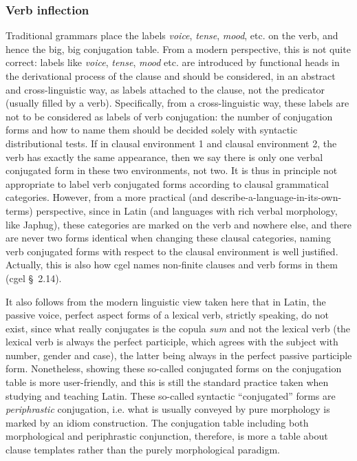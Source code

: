 \documentclass{article}
\newcommand*{\citesec}[1]{\S~{#1}}
\newcommand*{\term}[1]{\emph{#1}}
\newcommand*{\corpus}[1]{\emph{#1}}
\begin{document}
\subsubsection{Verb inflection}\label{sec:verb-inflection-abs}

Traditional grammars place the labels \term{voice}, \term{tense}, \term{mood}, etc. on the verb,
and hence the big, big conjugation table.
From a modern perspective, this is not quite correct:
labels like \term{voice}, \term{tense}, \term{mood} etc. are introduced by functional heads 
in the derivational process of the clause 
and should be considered, in an abstract and cross-linguistic way, 
as labels attached to the clause, not the predicator (usually filled by a verb).
Specifically, from a cross-linguistic way,
these labels are not to be considered as labels of verb conjugation:
the number of conjugation forms and how to name them should be decided 
solely with syntactic distributional tests. 
If in clausal environment 1 and clausal environment 2,
the verb has exactly the same appearance,
then we say there is only one verbal conjugated form in these two environments, not two.
It is thus in principle not appropriate to label verb conjugated forms according to 
clausal grammatical categories.
However, from a more practical (and describe-a-language-in-its-own-terms) perspective,
since in Latin (and languages with rich verbal morphology, like Japhug), 
these categories are marked on the verb and nowhere else,
and there are never two forms identical when changing these clausal categories,
naming verb conjugated forms with respect to the clausal environment
is well justified.
Actually, this is also how \ac{cgel} names non-finite clauses and verb forms in them (\ac{cgel} \citesec{2.14}).

It also follows from the modern linguistic view taken here 
that in Latin, the passive voice, perfect aspect forms of a lexical verb, 
strictly speaking, do not exist, since what really conjugates is the copula \corpus{sum} 
and not the lexical verb 
(the lexical verb is always the perfect participle, which agrees with the subject with number, gender and case),
the latter being always in the perfect passive participle form.
Nonetheless, showing these so-called conjugated forms on the conjugation table 
is more user-friendly, 
and this is still the standard practice taken when studying and teaching Latin.
These so-called syntactic ``conjugated'' forms are \emph{periphrastic} conjugation,
i.e. what is usually conveyed by pure morphology is marked by an idiom construction.  
The conjugation table including both morphological and periphrastic conjunction,
therefore, is more a table about clause templates rather than the purely morphological paradigm.
\end{document}
